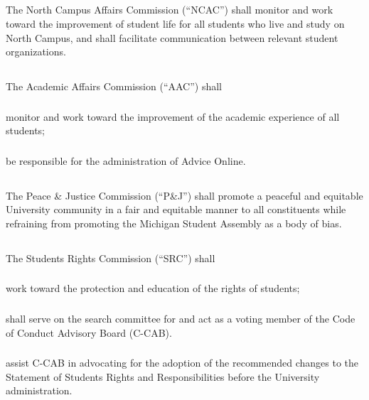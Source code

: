 \subsection{}
The North Campus Affairs Commission (``NCAC'') shall monitor and work toward the improvement of student life for all students who live and study on North Campus, and shall facilitate communication between relevant student organizations.

\subsection{}
The Academic Affairs Commission (``AAC'') shall 
\subsubsection{}
monitor and work toward the improvement of the academic experience of all students;
\subsubsection{}
be responsible for the administration of Advice Online.

\subsection{}
The Peace \& Justice Commission (``P\&J'') shall promote a peaceful and equitable University community in a fair and equitable manner to all constituents while refraining from promoting the Michigan Student Assembly as a body of bias.

\subsection{}
The Students Rights Commission (``SRC'') shall 
\subsubsection{}
work toward the protection and education of the rights of students;
\subsubsection{}
shall serve on the search committee for and act as a voting member of the Code of Conduct Advisory Board (C-CAB).
\subsubsection{}
assist C-CAB in advocating for the adoption of the recommended changes to the Statement of Students Rights and Responsibilities before the University administration.

